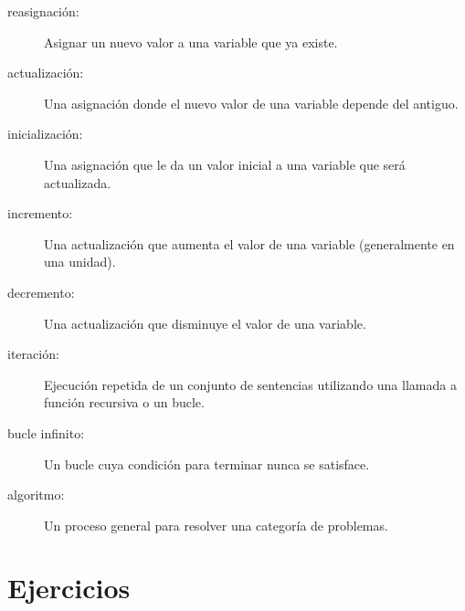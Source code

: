 \documentclass[10pt]{book}
\begin{document}
\begin{description}

\item[reasignación:] Asignar un nuevo valor a una variable que
ya existe.

\item[actualización:] Una asignación donde el nuevo valor de una variable
depende del antiguo.

\item[inicialización:] Una asignación que le da un valor inicial a
una variable que será actualizada.

\item[incremento:] Una actualización que aumenta el valor de una variable
(generalmente en una unidad).

\item[decremento:] Una actualización que disminuye el valor de una variable.

\item[iteración:] Ejecución repetida de un conjunto de sentencias utilizando
una llamada a función recursiva o un bucle.

\item[bucle infinito:] Un bucle cuya condición para terminar nunca
se satisface.

\item[algoritmo:]  Un proceso general para resolver una categoría de
problemas.

\end{description}


\section{Ejercicios}
\end{document}
